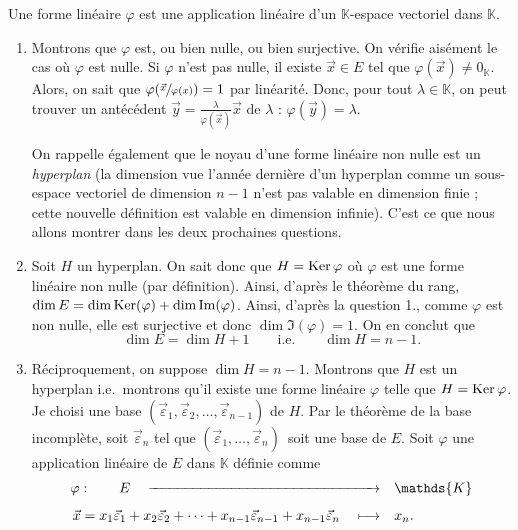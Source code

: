 \begin{exo}
	Une forme linéaire $\varphi$\/ est une application linéaire d'un $\mathds{K}$-espace vectoriel dans $\mathds{K}$.
	\begin{enumerate}
		\item Montrons que $\varphi$\/ est, ou bien nulle, ou bien surjective.
			On vérifie aisément le cas où $\varphi$\/ est nulle.
			Si $\varphi$\/ n'est pas nulle, il existe $\vec{x} \in E$\/ tel que $\varphi(\vec{x}) \neq 0_{\mathds{K}}$. Alors, on sait que $\varphi(\sfrac{\vec{x}}{\varphi(x)}) = 1$ par linéarité. Donc, pour tout $\lambda \in \mathds{K}$, on peut trouver un antécédent $\vec{y} = \frac{\lambda}{\varphi(\vec{x})} \vec{x}$\/ de $\lambda$\/ :  $\varphi(\vec{y}) = \lambda$.

			On rappelle également que le noyau d'une forme linéaire non nulle est un {\it hyperplan} (la dimension vue l'année dernière d'un hyperplan comme un sous-espace vectoriel de dimension $n-1$\/ n'est pas valable en dimension finie ; cette nouvelle définition est valable en dimension infinie). C'est ce que nous allons montrer dans les deux prochaines questions.
		\item Soit $H$\/ un hyperplan. On sait donc que $H = \operatorname{Ker} \varphi$\/ où $\varphi$\/ est une forme linéaire non nulle (par définition). Ainsi, d'après le théorème du rang, $\dim E = \dim \operatorname{Ker}(\varphi) + \dim \operatorname{Im}(\varphi)$. Ainsi, d'après la question 1., comme $\varphi$\/ est non nulle, elle est surjective et donc $\dim \Im(\varphi) = 1$. On en conclut que \[
				\dim E = \dim H + 1\qquad\text{i.e.}\qquad\dim H = n - 1
			.\]
		\item Réciproquement, on suppose $\dim H = n - 1$. Montrons que $H$\/ est un hyperplan i.e.\ montrons qu'il existe une forme linéaire $\varphi$ telle que $H = \operatorname{Ker} \varphi$. Je choisi une base $(\vec{\varepsilon}_1, \vec{\varepsilon}_2, \ldots, \vec{\varepsilon}_{n-1})$ de $H$. Par le théorème de la base incomplète, soit $\vec{\varepsilon}_n$\/ tel que $(\vec{\varepsilon}_1,\ldots,\vec{\varepsilon}_n)$\/~soit une base de $E$.
			Soit $\varphi$\/ une application linéaire de $E$\/ dans $\mathds{K}$\/ définie comme \begin{align*}
				\varphi:\qquad E\quad\xrightarrow[\qquad\qquad\qquad\qquad\qquad\qquad\qquad\qquad]{}&\quad\mathds{K} \\
				{\scriptsize\vec{x} = x_1 \vec{\varepsilon}_1 + x_2 \vec{\varepsilon}_2 + \cdots + x_{n-1}\vec{\varepsilon}_{n-1} + x_{n-1} \vec{\varepsilon}_n}\quad \longmapsto&\quad x_n.
			\end{align*}

\end{enumerate}
\end{exo}
